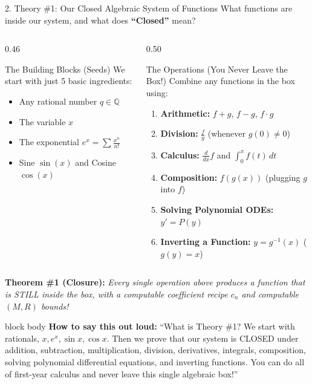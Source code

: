 \documentclass[aspectratio=169,11pt]{beamer}
\newcommand{\say}[1]{%
  \vfill
  \begin{beamercolorbox}[sep=5pt,rounded=true,shadow=false]{block body}
  {\footnotesize \textbf{\textcolor{deepblue}{How to say this out loud:}} ``#1''}
  \end{beamercolorbox}
}
\begin{document}
\begin{frame}[shrink=6]{2. Theory \#1: Our Closed Algebraic System of Functions}
  What functions are inside our system, and what does \textbf{``Closed''} mean?

  \begin{columns}[T]
    \begin{column}{0.46\textwidth}
      \begin{block}{The Building Blocks (Seeds)}
        We start with just 5 basic ingredients:
        \begin{itemize}
          \item Any rational number $q \in \mathbb{Q}$
          \item The variable $x$
          \item The exponential $e^x = \sum \frac{x^n}{n!}$
          \item Sine $\sin(x)$ and Cosine $\cos(x)$
        \end{itemize}
      \end{block}
    \end{column}
    \begin{column}{0.50\textwidth}
      \begin{block}{The Operations (You Never Leave the Box!)}
        Combine any functions in the box using:
        \begin{enumerate}
          \item \textbf{Arithmetic:} $f + g$, \; $f - g$, \; $f \cdot g$
          \item \textbf{Division:} $\frac{f}{g}$ \quad (whenever $g(0) \neq 0$)
          \item \textbf{Calculus:} $\frac{d}{dx}f$ \quad and \quad $\int_0^x f(t)\,dt$
          \item \textbf{Composition:} $f(g(x))$ \quad (plugging $g$ into $f$)
          \item \textbf{Solving Polynomial ODEs:} $y' = P(y)$
          \item \textbf{Inverting a Function:} $y = g^{-1}(x)$ ($g(y)=x$)
        \end{enumerate}
      \end{block}
    \end{column}
  \end{columns}

  \vspace{0.1cm}
  \centering
  \textbf{\textcolor{okgreen}{Theorem \#1 (Closure):}} \emph{Every single operation above produces a function that is STILL inside the box, with a computable coefficient recipe $c_n$ and computable $(M, R)$ bounds!}

  \say{What is Theory \#1? We start with rationals, $x, e^x, \sin x, \cos x$. Then we prove that our system is CLOSED under addition, subtraction, multiplication, division, derivatives, integrals, composition, solving polynomial differential equations, and inverting functions. You can do all of first-year calculus and never leave this single algebraic box!}
\end{frame}
\end{document}
